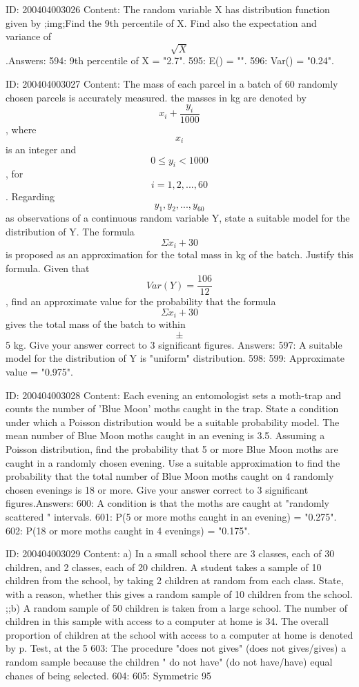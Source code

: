 \documentclass{article}
\begin{document}
ID: 200404003026
Content:
The random variable X has distribution function given by ;img;Find the 9th percentile of X. Find also the expectation and variance of $$\sqrt X$$.Answers:
594: 9th percentile of X = "2.7".
595: E() = "".
596: Var() = "0.24".

ID: 200404003027
Content:
The mass of each parcel in a batch of 60 randomly chosen parcels is accurately measured. the masses in kg are denoted by $$x_i + \frac{y_i}{1000}$$, where $$x_i$$ is an integer and $$0 \leq y_i < 1000$$, for $$i=1,2,...,60$$. Regarding $$y_1, y_2,...,y_{60}$$ as observations of a continuous random variable Y, state a suitable model for the distribution of Y. The formula $$\Sigma x_i +30$$ is proposed as an approximation for the total mass in kg of the batch. Justify this formula. Given that $$Var(Y) = \frac{106}{12}$$, find an approximate value for the probability that the formula $$\Sigma x_i+30$$ gives the total mass of the batch to within $$\pm$$ 5 kg. Give your answer correct to 3 significant figures. Answers:
597: A suitable model for the distribution of Y is "uniform" distribution.
598: 
599: Approximate value = "0.975".

ID: 200404003028
Content:
Each evening an entomologist sets a moth-trap and counts the number of 'Blue Moon' moths caught in the trap. State a condition under which a Poisson distribution would be a suitable probability model.  The mean number of Blue Moon moths caught in an evening is 3.5. Assuming a Poisson distribution, find the probability that 5 or more Blue Moon moths are caught in a randomly chosen evening.  Use a suitable approximation to find the probability that the total number of Blue Moon moths caught on 4 randomly chosen evenings is 18 or more. Give your answer correct to 3 significant figures.Answers:
600: A condition is that the moths are caught at "randomly scattered " intervals.
601: P(5 or more moths caught in an evening) = "0.275".
602: P(18 or more moths caught in 4 evenings) = "0.175".

ID: 200404003029
Content:
a) In a small school there are 3 classes, each of 30 children, and 2 classes, each of 20 children. A student takes a sample of 10 children from the school, by taking 2 children at random from each class. State, with a reason, whether this gives a random sample of 10 children from the school. ;;b) A random sample of 50 children is taken from a large school. The number of children in this sample with access to a computer at home is 34. The overall proportion of children at the school with access to a computer at home is denoted by p. Test, at the 5%
603: The procedure "does not gives" (does not gives/gives) a random sample because the children " do not have" (do not have/have) equal chanes of being selected.
604: 
605: Symmetric 95%
\end{document}
